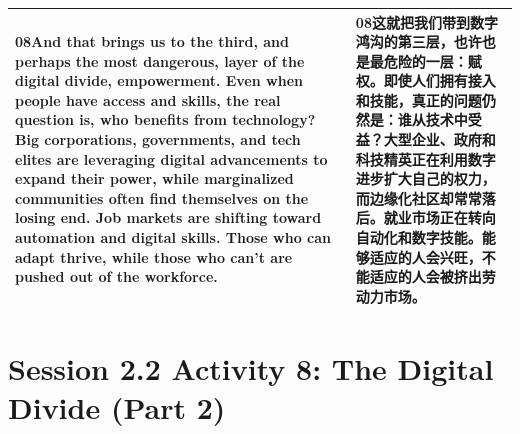 \documentclass[UTF8,zihao=-4,fontset=fandol]{ctexart}
\newcommand{\TranscriptColumn}{\raggedright\arraybackslash\hyphenpenalty=10000\exhyphenpenalty=10000\sloppy}
\begin{document}
\begin{longtable}{>{\TranscriptColumn}p{} >{\TranscriptColumn}p{}}
\textbf{08}\quad And that brings us to the third, and perhaps the most dangerous, layer of the digital divide, empowerment. Even when people have access and skills, the real question is, who benefits from technology? Big corporations, governments, and tech elites are leveraging digital advancements to expand their power, while marginalized communities often find themselves on the losing end. Job markets are shifting toward automation and digital skills. Those who can adapt thrive, while those who can't are pushed out of the workforce. & \textbf{08}\quad 这就把我们带到数字鸿沟的第三层，也许也是最危险的一层：赋权。即使人们拥有接入和技能，真正的问题仍然是：谁从技术中受益？大型企业、政府和科技精英正在利用数字进步扩大自己的权力，而边缘化社区却常常落后。就业市场正在转向自动化和数字技能。能够适应的人会兴旺，不能适应的人会被挤出劳动力市场。 \\ \hline
\end{longtable}


\clearpage
\section{Session 2.2 Activity 8: The Digital Divide (Part 2)}
\end{document}

